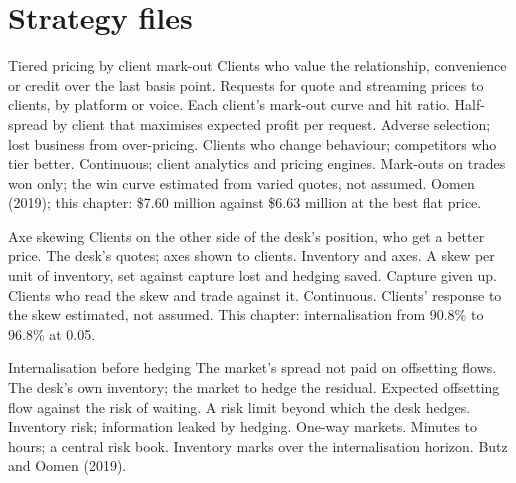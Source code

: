 \section{Strategy files}

\begin{strategyfile}{Tiered pricing by client mark-out}\label{strat:s2:flow-market-making-at-a-bank:tier}
 Clients who value the relationship, convenience or credit over the last basis point.
 Requests for quote and streaming prices to clients, by platform or voice.
 Each client's mark-out curve and hit ratio.
 Half-spread by client that maximises expected profit per request.
 Adverse selection; lost business from over-pricing.
 Clients who change behaviour; competitors who tier better.
 Continuous; client analytics and pricing engines.
 Mark-outs on trades won only; the win curve estimated from varied quotes, not assumed.
 Oomen (2019); this chapter: \$7.60 million against \$6.63 million at the best flat price.
\end{strategyfile}

\begin{strategyfile}{Axe skewing}\label{strat:s2:flow-market-making-at-a-bank:skew}
 Clients on the other side of the desk's position, who get a better price.
 The desk's quotes; axes shown to clients.
 Inventory and axes.
 A skew per unit of inventory, set against capture lost and hedging saved.
 Capture given up.
 Clients who read the skew and trade against it.
 Continuous.
 Clients' response to the skew estimated, not assumed.
 This chapter: internalisation from 90.8\% to 96.8\% at 0.05.
\end{strategyfile}

\begin{strategyfile}{Internalisation before hedging}\label{strat:s2:flow-market-making-at-a-bank:internalise}
 The market's spread not paid on offsetting flows.
 The desk's own inventory; the market to hedge the residual.
 Expected offsetting flow against the risk of waiting.
 A risk limit beyond which the desk hedges.
 Inventory risk; information leaked by hedging.
 One-way markets.
 Minutes to hours; a central risk book.
 Inventory marks over the internalisation horizon.
 Butz and Oomen (2019).
\end{strategyfile}

